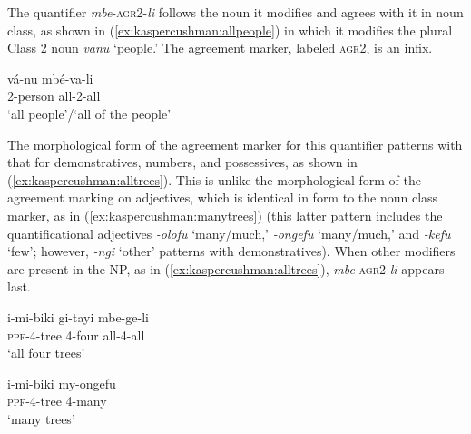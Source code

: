 \documentclass[output=paper,modfonts,nonflat]{langsci/langscibook}
\begin{document}
 The quantifier \emph{mbe}-\textsc{agr2}-\emph{li} follows the noun it modifies and agrees with it in noun class, as shown in (\ref{ex:kaspercushman:allpeople}) in which it modifies the plural Class 2 noun \textit{vanu} `people.' The agreement marker, labeled \textsc{agr2}, is an infix.  

\begin{exe}
\ex \label{ex:kaspercushman:allpeople}
\gll vá-nu mbé-va-li \\
2-person all-2-all \\
\glt `all people'/`all of the people'\footnotemark \\

\end{exe}

The morphological form of the agreement marker for this quantifier patterns with that for demonstratives, numbers, and possessives, as shown in (\ref{ex:kaspercushman:alltrees}).  This is unlike the morphological form of the agreement marking on adjectives, which is identical in form to the noun class marker, as in (\ref{ex:kaspercushman:manytrees}) (this latter pattern includes the quantificational adjectives \textit{-olofu} `many/much,' \textit{-ongefu} `many/much,' and \textit{-kefu} `few'; however, \textit{-ngi} `other' patterns with demonstratives). When other modifiers are present in the NP, as in (\ref{ex:kaspercushman:alltrees}),   \textit{mbe}-\textsc{agr2}-\textit{li} appears last.


\begin{exe}

\ex\begin{xlist}

\ex 
\gll i-mi-biki gi-tayi mbe-ge-li\\ 
\textsc{ppf}-4-tree 4-four all-4-all\\
\glt `all four trees' \\ \label{ex:kaspercushman:alltrees}

\ex 
\gll i-mi-biki my-ongefu\\
\textsc{ppf}-4-tree 4-many \\
\glt `many trees' \label{ex:kaspercushman:manytrees}

\end{xlist}

\end{exe}
\end{document}
